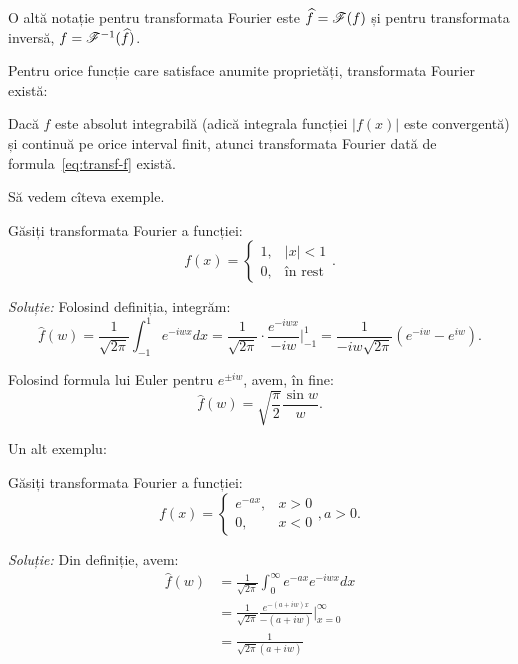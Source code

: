 O altă notație pentru transformata Fourier este $ \widehat{f} = \mathscr{F}(f) $ și
pentru transformata inversă, $ f = \mathscr{F}^{-1}(\widehat{f}) $.

Pentru orice funcție care satisface anumite proprietăți, transformata Fourier există:

\begin{theorem}\label{thm:ex-four}
  Dacă $ f $ este absolut integrabilă (adică integrala funcției $ |f(x)| $ este convergentă)
  și continuă pe orice interval finit, atunci transformata Fourier dată de
  formula~\eqref{eq:transf-f} există.
\end{theorem}

Să vedem cîteva exemple.

\begin{example}
  Găsiți transformata Fourier a funcției:
  \[
    f(x) =
    \begin{cases}
      1, & |x| < 1 \\
      0, & \text{în rest}
    \end{cases}.
  \]
\end{example}

\emph{Soluție:} Folosind definiția, integrăm:
\[
  \widehat{f}(w) = \frac{1}{\sqrt{2\pi}} \int_{-1}^1 e^{-iwx} dx = %
  \frac{1}{\sqrt{2\pi}} \cdot \frac{e^{-iwx}}{-iw} \Big|_{-1}^1 = %
  \frac{1}{-iw\sqrt{2\pi}}(e^{-iw} - e^{iw}).
\]

Folosind formula lui Euler pentru $ e^{\pm iw} $, avem, în fine:
\[
  \widehat{f}(w) = \sqrt{\frac{\pi}{2}} \frac{\sin w}{w}.
\]

Un alt exemplu:

\begin{example}
  Găsiți transformata Fourier a funcției:
  \[
    f(x) =
    \begin{cases}
      e^{-ax}, & x > 0 \\
      0, & x < 0
    \end{cases}, a > 0.
  \]
\end{example}

\emph{Soluție:} Din definiție, avem:
\begin{align*}
  \widehat{f}(w) &= \frac{1}{\sqrt{2\pi}} \int_0^\infty e^{-ax} e^{-iwx} dx \\
                 &= \frac{1}{\sqrt{2\pi}} \frac{e^{-(a + iw)x}}{-(a + iw)} \Big|_{x = 0}^\infty \\
                 &= \frac{1}{\sqrt{2\pi}(a + iw)}
\end{align*}


